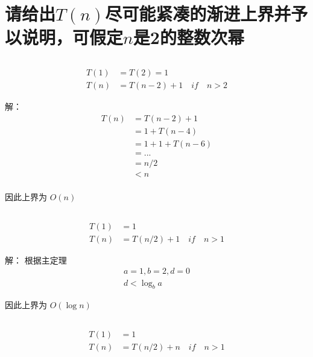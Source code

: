 \section{请给出$T(n)$尽可能紧凑的渐进上界并予以说明，可假定$n$是2的整数次幂}

\subsection{}
\begin{equation}
    \begin{aligned}
        T(1) &=T(2)=1\\
        T(n) &=T(n-2)+1\quad if\quad n>2
    \end{aligned}
    \nonumber
\end{equation}

解：
\begin{equation}
    \begin{aligned}
        T(n) &=T(n-2)+1\\
             &=1+T(n-4)\\
             &=1+1+T(n-6)\\
             &=...\\
             &=n/2\\
             & <n\\
    \end{aligned}
    \nonumber
\end{equation}

因此上界为 $O(n)$    

\subsection{}
\begin{equation}
    \begin{aligned}
        T(1) &=1\\
        T(n) &=T(n/2)+1\quad if\quad n>1
    \end{aligned}
    \nonumber
\end{equation}

解：
根据主定理
\begin{equation}
    \begin{aligned}
        a=1,b=2,d=0\\
        d<\log_{b}a
    \end{aligned}
    \nonumber
\end{equation}

因此上界为 $O(\log n)$

\subsection{}
\begin{equation}
    \begin{aligned}
        T(1) &=1\\
        T(n) &=T(n/2)+n\quad if\quad n>1
    \end{aligned}
    \nonumber
\end{equation}

